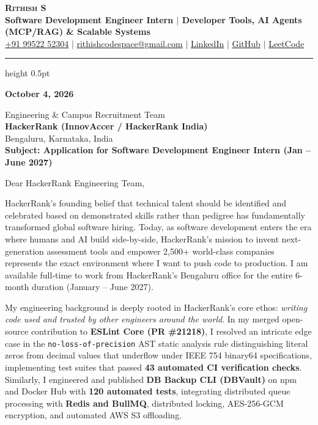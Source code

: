 \documentclass[letterpaper,11pt]{article}
\begin{document}
\begin{center}
    {\textbf{\Huge \scshape Rithish S}} \\ \vspace{3pt}
    {\small \textbf{\color{headingcolor}Software Development Engineer Intern $|$ Developer Tools, AI Agents (MCP/RAG) \& Scalable Systems}} \\ \vspace{3pt}
    \small
    \href{tel:+919952252304}{+91 99522 52304} $|$
    \href{mailto:rithishcodespace@gmail.com}{rithishcodespace@gmail.com} $|$
    \href{https://www.linkedin.com/in/rithish-saravanan-32a39431a/}{LinkedIn} $|$
    \href{https://github.com/rithishcodespace}{GitHub} $|$
    \href{https://leetcode.com/rithishcodespace}{LeetCode}
\end{center}

\vspace{-4pt}
\hrule height 0.5pt \relax
\vspace{8pt}

\textbf{October 4, 2026}

\vspace{2pt}
Engineering \& Campus Recruitment Team \\
\textbf{HackerRank (InnovAccer / HackerRank India)} \\
Bengaluru, Karnataka, India \\

\vspace{3pt}
\textbf{Subject: Application for Software Development Engineer Intern (Jan -- June 2027)}

\vspace{3pt}
Dear HackerRank Engineering Team,

HackerRank's founding belief that technical talent should be identified and celebrated based on demonstrated skills rather than pedigree has fundamentally transformed global software hiring. Today, as software development enters the era where humans and AI build side-by-side, HackerRank's mission to invent next-generation assessment tools and empower 2,500+ world-class companies represents the exact environment where I want to push code to production. I am available full-time to work from HackerRank's Bengaluru office for the entire 6-month duration (January -- June 2027).

My engineering background is deeply rooted in HackerRank's core ethos: \textit{writing code used and trusted by other engineers around the world}. In my merged open-source contribution to \textbf{ESLint Core (PR \#21218)}, I resolved an intricate edge case in the \texttt{no-loss-of-precision} AST static analysis rule distinguishing literal zeros from decimal values that underflow under IEEE 754 binary64 specifications, implementing test suites that passed \textbf{43 automated CI verification checks}. Similarly, I engineered and published \textbf{DB Backup CLI (DBVault)} on npm and Docker Hub with \textbf{120 automated tests}, integrating distributed queue processing with \textbf{Redis and BullMQ}, distributed locking, AES-256-GCM encryption, and automated AWS S3 offloading.
\end{document}
